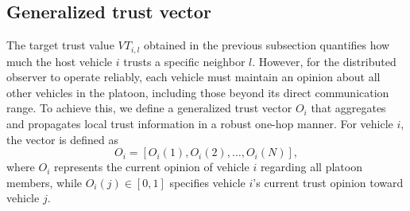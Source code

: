 \documentclass{ifacconf}
\def\O{\mathcal{O}} %
\begin{document}









\vspace*{-0.3cm}
\subsection{Generalized trust vector}
\vspace*{-0.2cm}
The target trust value $VT_{i,l}$ obtained in the previous subsection quantifies how much the host vehicle $i$ trusts a specific neighbor $l$.
However, for the distributed observer to operate reliably, each vehicle must maintain an opinion about all other vehicles in the platoon, including those beyond its direct communication range.
To achieve this, we define a generalized trust vector 
$O_i$ that aggregates and propagates local trust information in a robust one-hop manner. For vehicle $i$, the vector is defined as
\begin{equation}
O_i = [O_i(1), O_i(2), \ldots, O_i(N)] ,
\end{equation}
where $O_i$ represents the current opinion of vehicle $i$ regarding all platoon members, while $O_i(j) \in [0,1]$ specifies vehicle $i$'s current trust opinion toward vehicle $j$.
\end{document}
